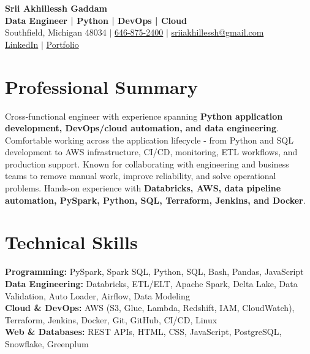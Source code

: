 \documentclass[letterpaper,10pt]{article}
\begin{document}
\fontsize{9.35pt}{10.45pt}\selectfont

\begin{center}
    {\LARGE \textbf{Srii Akhillessh Gaddam}} \\[-1pt]
    \textbf{Data Engineer | Python | DevOps | Cloud} \\[2pt]
    Southfield, Michigan 48034 $|$
    \href{tel:6468752400}{646-875-2400} $|$
    \href{mailto:sriiakhillessh@gmail.com}{sriiakhillessh@gmail.com} \\[1pt]
    \href{https://www.linkedin.com/in/srii-akhiilessh-gaddam-b48668191/}{LinkedIn} $|$
    \href{https://sriiakhillesshg.github.io/portfolio/}{Portfolio}
\end{center}
\vspace{-8pt}

\section{Professional Summary}
\small{Cross-functional engineer with experience spanning \textbf{Python application development, DevOps/cloud automation, and data engineering}. Comfortable working across the application lifecycle - from Python and SQL development to AWS infrastructure, CI/CD, monitoring, ETL workflows, and production support. Known for collaborating with engineering and business teams to remove manual work, improve reliability, and solve operational problems. Hands-on experience with \textbf{Databricks, AWS, data pipeline automation, PySpark, Python, SQL, Terraform, Jenkins, and Docker}.}

\section{Technical Skills}
\small{
\textbf{Programming:} PySpark, Spark SQL, Python, SQL, Bash, Pandas, JavaScript \\
\textbf{Data Engineering:} Databricks, ETL/ELT, Apache Spark, Delta Lake, Data Validation, Auto Loader, Airflow, Data Modeling \\
\textbf{Cloud \& DevOps:} AWS (S3, Glue, Lambda, Redshift, IAM, CloudWatch), Terraform, Jenkins, Docker, Git, GitHub, CI/CD, Linux \\
\textbf{Web \& Databases:} REST APIs, HTML, CSS, JavaScript, PostgreSQL, Snowflake, Greenplum
}

\end{document}
